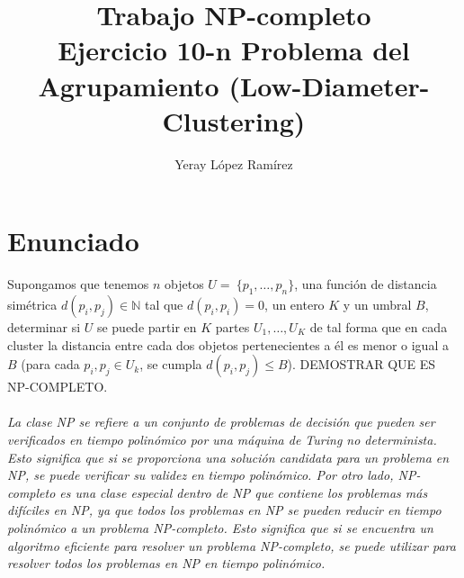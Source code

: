 

\title{
	Trabajo NP-completo \\\vspace{1cm}
	Ejercicio 10-n 
	Problema del Agrupamiento
	(Low-Diameter-Clustering)
 }   

\author{Yeray López Ramírez	}                             

\renewcommand*\contentsname{hola}

\makeatletter
\let\thetitle\@title
\let\theauthor\@author
\let\thedate\@date
\makeatother





\newpage %
\newcommand{\code}[1]{\colorbox{light-gray}{\textcolor{alizarin}{\texttt{#1}}}}
\newcommand{\high}[1]{\colorbox{light-gray}{\textcolor{nyellow}{\texttt{#1}}}}

\tableofcontents %

\newpage


\section{Enunciado}
Supongamos que tenemos $n$ objetos $U = \ \{p_1, \ldots, p_n\}$, una función de distancia simétrica $d(p_i, p_j) \in \mathbb{N}$ tal que $d(p_i, p_i) = 0$, un entero $K$ y un umbral $B$, determinar si $U$ se puede partir en $K$ partes $U_1, \ldots, U_K$ de tal forma que en cada cluster la distancia entre cada dos objetos pertenecientes a él es menor o igual a $B$ (para cada $p_i, p_j \in U_k$, se cumpla $d(p_i, p_j) \leq B$). DEMOSTRAR QUE ES NP-COMPLETO.
\\ \quad \\
\textit{La clase NP se refiere a un conjunto de problemas de decisión que pueden ser verificados en tiempo polinómico por una máquina de Turing no determinista. Esto significa que si se proporciona una solución candidata para un problema en NP, se puede verificar su validez en tiempo polinómico. Por otro lado, NP-completo es una clase especial dentro de NP que contiene los problemas más difíciles en NP, ya que todos los problemas en NP se pueden reducir en tiempo polinómico a un problema NP-completo. Esto significa que si se encuentra un algoritmo eficiente para resolver un problema NP-completo, se puede utilizar para resolver todos los problemas en NP en tiempo polinómico.
}


